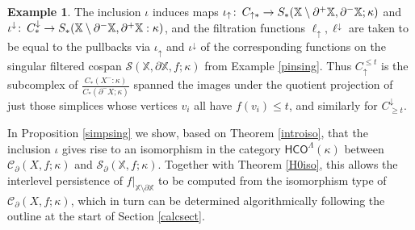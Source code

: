 \documentclass[11pt]{amsart}
\theoremstyle{definition}
\newtheorem{ex}[theorem]{Example}
\theoremstyle{remark}
\numberwithin{equation}{section}
\def\co{\colon\thinspace}
\begin{document}
\begin{ex}
	The inclusion $\iota$ induces maps $\iota_{\uparrow}\co C_{\uparrow *}\to S_*(\mathbb{X}\setminus\partial^+\mathbb{X},\partial^-\mathbb{X};\kappa)$ and $\iota^{\downarrow}\co C^{\downarrow}_{*}\to S_*(\mathbb{X}\setminus \partial^-\mathbb{X},\partial^+\mathbb{X}:\kappa)$, and the filtration functions $\ell_{\uparrow},\ell^{\downarrow}$ are taken to be equal to the pullbacks via $\iota_{\uparrow}$ and $\iota^{\downarrow}$ of the corresponding functions on the singular filtered cospan $\mathcal{S}(\mathbb{X},\partial\mathbb{X},f;\kappa)$ from Example \ref{pinsing}.
	Thus $C_{\uparrow}^{\leq t}$ is the subcomplex of $\frac{C_*(X^-:\kappa)}{C_*(\partial^-X;\kappa)}$ spanned the images under the quotient projection of just those simplices whose vertices $v_i$ all have $f(v_i)\leq t$, and similarly for $C^{\downarrow}_{\geq t}$.  
	
	In Proposition \ref{simpsing} we show, based on Theorem \ref{introiso}, that the inclusion $\iota$ gives rise to an isomorphism in the category $\mathsf{HCO}^{\Lambda}(\kappa)$ between $\mathcal{C}_{\partial}(X,f;\kappa)$ and $\mathcal{S}_{\partial}(\mathbb{X},f;\kappa)$. Together with Theorem \ref{H0iso}, this allows the interlevel persistence of $f|_{\mathbb{X}\setminus\partial\mathbb{X}}$ to be computed from the isomorphism type of $\mathcal{C}_{\partial}(X,f;\kappa)$, which in turn can be determined algorithmically following the outline at the start of Section \ref{calcsect}.
\end{ex}
\end{document}

